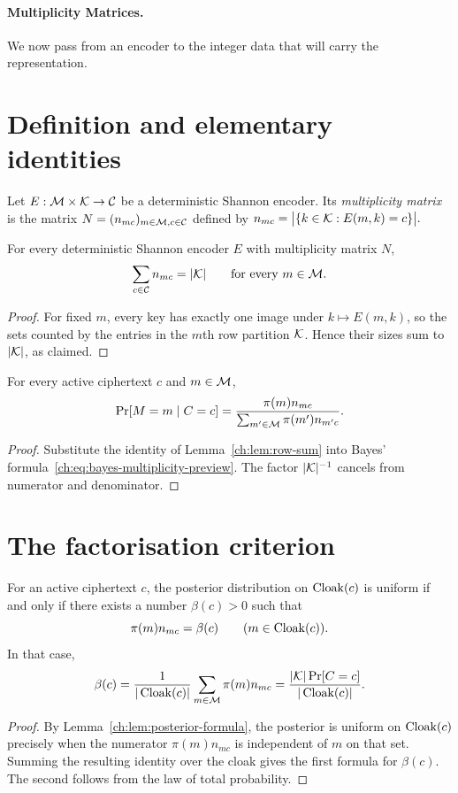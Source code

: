 \paragraph{Multiplicity Matrices.}
We now pass from an encoder to the integer data that will carry the representation.



\section{Definition and elementary identities}\label{ch:sec:definition-and-elementary-identities}
\begin{definition}\label{ch:def:multiplicity}
Let $E:\mathcal{M}\times\mathcal{K}\to\mathcal{C}$ be a deterministic Shannon encoder. Its \emph{multiplicity matrix} is the matrix $N=(n_{mc})_{m\in\mathcal{M},c\in\mathcal{C}}$ defined by
$n_{mc}=\bigl|\{k\in\mathcal{K}:E(m,k)=c\}\bigr|.$
\end{definition}
\begin{lemma}\label{ch:lem:row-sum}
For every deterministic Shannon encoder $E$ with multiplicity matrix $N$,
\[
\sum_{c\in\mathcal{C}} n_{mc}=|\mathcal{K}|\qquad\text{for every } m\in\mathcal{M}.
\]
\end{lemma}
\begin{proof}
For fixed $m$, every key has exactly one image under $k\mapsto E(m,k)$, so the sets counted by the entries in the $m$th row partition $\mathcal{K}$. Hence their sizes sum to $|\mathcal{K}|$, as claimed.
\end{proof}

\begin{lemma}\label{ch:lem:posterior-formula}
For every active ciphertext $c$ and $m\in\mathcal{M}$,
\[
 \Pr[M=m\mid C=c]
 =\frac{\pi(m)n_{mc}}{\sum_{m'\in\mathcal{M}}\pi(m')n_{m'c}}.
\]
\end{lemma}
\begin{proof}
Substitute the identity of Lemma~\ref{ch:lem:row-sum} into Bayes' formula~\eqref{ch:eq:bayes-multiplicity-preview}. The factor $|\mathcal{K}|^{-1}$ cancels from numerator and denominator.
\end{proof}
\section{The factorisation criterion}\label{ch:sec:the-factorisation-criterion}
\begin{proposition}\label{ch:prop:factorisation-criterion}
For an active ciphertext $c$, the posterior distribution on $\operatorname{Cloak}(c)$ is uniform if and only if there exists a number $\beta(c)>0$ such that
\[
 \pi(m)n_{mc}=\beta(c)
 \qquad(m\in\operatorname{Cloak}(c)).
\]
In that case,
\[
 \beta(c)=\frac{1}{|\operatorname{Cloak}(c)|}\sum_{m\in\mathcal{M}}\pi(m)n_{mc}
 =\frac{|\mathcal{K}|\Pr[C=c]}{|\operatorname{Cloak}(c)|}.
\]
\end{proposition}
\begin{proof}
By Lemma~\ref{ch:lem:posterior-formula}, the posterior is uniform on $\operatorname{Cloak}(c)$ precisely when the numerator $\pi(m)n_{mc}$ is independent of $m$ on that set. Summing the resulting identity over the cloak gives the first formula for $\beta(c)$. The second follows from the law of total probability.
\end{proof}


